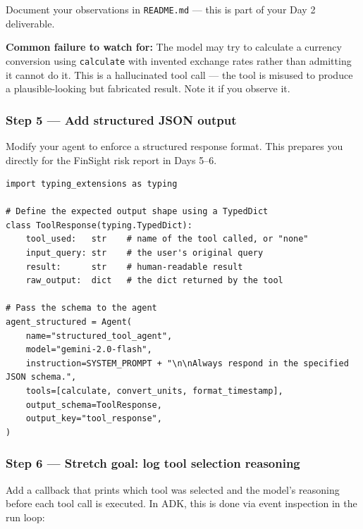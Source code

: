 \documentclass[12pt, a4paper]{article}
\begin{document}
\begin{practicalbox}
Document your observations in \texttt{README.md} --- this is part of your Day 2 deliverable.

\begin{warnbox}
\textbf{Common failure to watch for:} The model may try to calculate a currency conversion using \texttt{calculate} with invented exchange rates rather than admitting it cannot do it. This is a hallucinated tool call --- the tool is misused to produce a plausible-looking but fabricated result. Note it if you observe it.
\end{warnbox}

\subsubsection*{Step 5 --- Add structured JSON output}

Modify your agent to enforce a structured response format. This prepares you directly for the FinSight risk report in Days 5--6.

\begin{lstlisting}[style=pythonstyle, caption={Enforcing structured output via response\_schema}]
import typing_extensions as typing

# Define the expected output shape using a TypedDict
class ToolResponse(typing.TypedDict):
    tool_used:   str    # name of the tool called, or "none"
    input_query: str    # the user's original query
    result:      str    # human-readable result
    raw_output:  dict   # the dict returned by the tool

# Pass the schema to the agent
agent_structured = Agent(
    name="structured_tool_agent",
    model="gemini-2.0-flash",
    instruction=SYSTEM_PROMPT + "\n\nAlways respond in the specified JSON schema.",
    tools=[calculate, convert_units, format_timestamp],
    output_schema=ToolResponse,
    output_key="tool_response",
)
\end{lstlisting}

\subsubsection*{Step 6 --- Stretch goal: log tool selection reasoning}

Add a callback that prints which tool was selected and the model's reasoning before each tool call is executed. In ADK, this is done via event inspection in the run loop:


\end{practicalbox}
\end{document}
